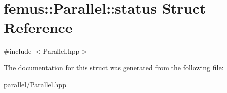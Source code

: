 \hypertarget{structfemus_1_1_parallel_1_1status}{}\section{femus\+:\+:Parallel\+:\+:status Struct Reference}
\label{structfemus_1_1_parallel_1_1status}


{\ttfamily \#include $<$Parallel.\+hpp$>$}



The documentation for this struct was generated from the following file\+:\begin{DoxyCompactItemize}
\item 
parallel/\mbox{\hyperlink{_parallel_8hpp}{Parallel.\+hpp}}\end{DoxyCompactItemize}

